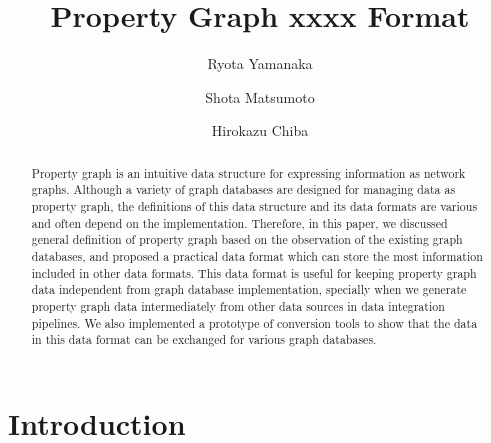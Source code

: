 \documentclass[runningheads]{llncs}
\begin{document}
\newtheorem{defi}[theorem]{Definition}
%
\title{Property Graph xxxx Format}
%
%
\author{Ryota Yamanaka \and Shota Matsumoto \and Hirokazu Chiba}
%
%
%
\maketitle              %
%
\begin{abstract}
Property graph is an intuitive data structure for expressing information as network graphs. Although a variety of graph databases are designed for managing data as property graph, the definitions of this data structure and its data formats are various and often depend on the implementation. Therefore, in this paper, we discussed general definition of property graph based on the observation of the existing graph databases, and proposed a practical data format which can store the most information included in other data formats. This data format is useful for keeping property graph data independent from graph database implementation, specially when we generate property graph data intermediately from other data sources in data integration pipelines. We also implemented a prototype of conversion tools to show that the data in this data format can be exchanged for various graph databases.
\end{abstract}

\section{Introduction}
\end{document}

